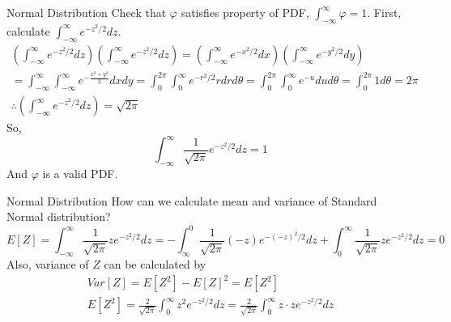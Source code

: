 \documentclass[8pt]{beamer}
\begin{document}
\begin{frame}{Normal Distribution}
    Check that $\varphi$ satisfies property of PDF, $\int_{-\infty}^\infty \varphi =1$. First, calculate $\int_{-\infty}^\infty e^{-z^2/2}dz$.
    \[
    \begin{gathered}
        \left( \int_{-\infty}^\infty e^{-z^2/2} dz \right)\left( \int_{-\infty}^\infty e^{-z^2/2} dz \right) =  \left( \int_{-\infty}^\infty e^{-x^2/2} dx \right)\left( \int_{-\infty}^\infty e^{-y^2/2} dy \right)\\
        = \int_{-\infty}^\infty \int_{-\infty}^\infty e^{-\frac{x^2 + y^2}{2}} dx dy = \int_{0}^{2\pi} \int_{0}^{\infty} e^{-r^2 /2} r dr d\theta = \int_{0}^{2\pi} \int_0^\infty e^{-u} du d\theta =\int_0^{2\pi} 1 d\theta = 2\pi  \\
        \therefore  \left( \int_{-\infty}^\infty e^{-z^2/2} dz \right) = \sqrt{2\pi}
    \end{gathered}
    \]
    So,
    \[
    \int_{-\infty}^{\infty} \frac{1}{\sqrt{2\pi}}e^{-z^2/2} dz = 1
    \]
    And $\varphi$ is a valid PDF.

\end{frame}

\begin{frame}{Normal Distribution}
    How can we calculate mean and variance of Standard Normal distribution?
    \[E[Z] = \int_{-\infty}^\infty \frac{1}{\sqrt{2\pi}} z e^{-z^2/2} dz = -\int_{\infty}^0 \frac{1}{\sqrt{2\pi}} (-z)e^{-(-z)^2/2} dz + \int_0^\infty \frac{1}{\sqrt{2\pi}}ze^{-z^2/2}dz = 0\]
    Also, variance of $Z$ can be calculated by
    \[
    \begin{gathered}
        Var[Z] = E[Z^2] - E[Z]^2 = E[Z^2]\\
        E[Z^2] =  \frac{2}{\sqrt{2\pi}}\int_0^{\infty}z^2 e^{-z^2/2} dz = \frac{2}{\sqrt{2\pi}}\int_0^\infty z\cdot ze^{-z^2/2}dz
    \end{gathered}
    \]
\end{frame}
\end{document}
